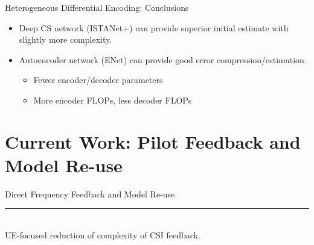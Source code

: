 \documentclass{beamer}
\begin{document}
  \begin{frame}{Heterogeneous Differential Encoding: Conclusions}
    \begin{itemize}
      \item Deep CS network (ISTANet+) can provide superior initial estimate with slightly more complexity.
      \item Autoencoder network (ENet) can provide good error compression/estimation.
      \begin{itemize}
        \item Fewer encoder/decoder parameters
        \item More encoder FLOPs, less decoder FLOPs
      \end{itemize}
    \end{itemize}
  \end{frame}

\section{Current Work: Pilot Feedback and Model Re-use}

  \begin{frame}[plain]
    \vfill
    \centering
    \begin{beamercolorbox}[sep=8pt,center,shadow=true,rounded=true]{Direct Frequency Feedback and Model Re-use}
      \insertsectionhead\par%
      \color{davisblue}\noindent\rule{10cm}{1pt} \\
      \footnotesize{UE-focused reduction of complexity of CSI feedback.} 
    \end{beamercolorbox}
    \vfill
  \end{frame}


\end{document}

